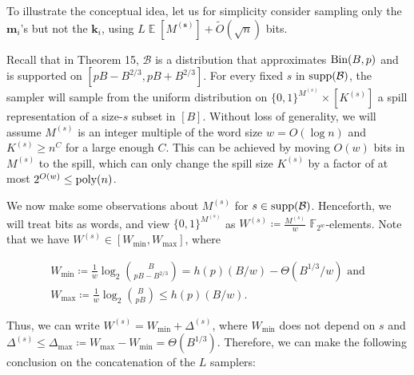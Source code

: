 To illustrate the conceptual idea, let us for simplicity consider sampling only the $\boldsymbol{m}_{i}$’s but not the $\boldsymbol{k}_{i}$, using $L\operatorname{\mathbb{E}}[M^{(\boldsymbol{s})}]+\widetilde{O}(\sqrt{n})$ bits.\par




Recall that in Theorem 15, $\mathcal{B}$ is a distribution that approximates $\textnormal{Bin}(B,p)$ and is supported on $[pB-B^{2/3},pB+B^{2/3}]$.
For every fixed $s$ in ${\rm supp}(\mathcal{B})$, the sampler will sample from the uniform distribution on $\{0,1\}^{M^{(s)}}\times[K^{(s)}]$ a spill representation of a size-$s$ subset in $[B]$.
Without loss of generality, we will assume $M^{(s)}$ is an integer multiple of the word size $w=O(\log n)$ and $K^{(s)}\geq n^{C}$ for a large enough $C$.
This can be achieved by moving $O(w)$ bits in $M^{(s)}$ to the spill, which can only change the spill size $K^{(s)}$ by a factor of at most $2^{O(w)}\leq\textnormal{poly}(n)$.\par




We now make some observations about $M^{(s)}$ for $s\in{\rm supp}(\mathcal{B})$.
Henceforth, we will treat bits as words, and view $\{0,1\}^{M^{(s)}}$ as $W^{(s)}\coloneq\tfrac{M^{(s)}}{w}$ $\mathbb{F}_{2^{w}}$-elements.
Note that we have $W^{(s)}\in[W_{\min},W_{\max}]$, where\par


\[\begin{gathered}
\displaystyle W_{\min} \displaystyle\coloneq\frac{1}{w}\log_{2}\binom{B}{pB-B^{2/3}}=h(p)(B/w)-\Theta(B^{1/3}/w)\text{ and} \\
\displaystyle W_{\max} \displaystyle\coloneq\frac{1}{w}\log_{2}\binom{B}{pB}\leq h(p)(B/w).
\end{gathered}\]


Thus, we can write $W^{(s)}=W_{\min}+\Delta^{(s)}$, where $W_{\min}$ does not depend on $s$ and $\Delta^{(s)}\leq\Delta_{\max}\coloneq W_{\max}-W_{\min}=\Theta(B^{1/3})$.
Therefore, we can make the following conclusion on the concatenation of the $L$ samplers:\par


